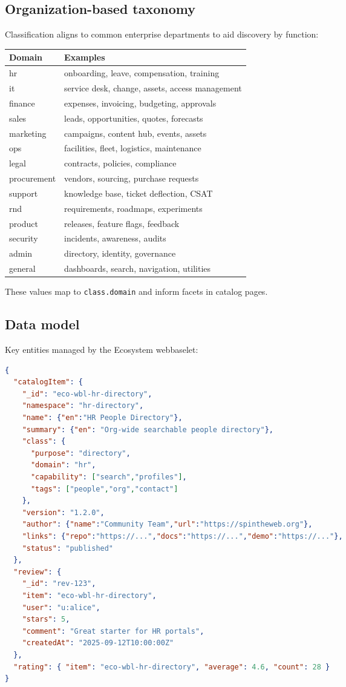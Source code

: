 \subsection{Organization-based taxonomy}
Classification aligns to common enterprise departments to aid discovery by function:
\begin{tabularx}{\linewidth}{@{}l X@{}}
  \textbf{Domain} & \textbf{Examples} \\
\hline
hr & onboarding, leave, compensation, training \\
it & service desk, change, assets, access management \\
finance & expenses, invoicing, budgeting, approvals \\
sales & leads, opportunities, quotes, forecasts \\
marketing & campaigns, content hub, events, assets \\
ops & facilities, fleet, logistics, maintenance \\
legal & contracts, policies, compliance \\
procurement & vendors, sourcing, purchase requests \\
support & knowledge base, ticket deflection, CSAT \\
rnd & requirements, roadmaps, experiments \\
product & releases, feature flags, feedback \\
security & incidents, awareness, audits \\
admin & directory, identity, governance \\
general & dashboards, search, navigation, utilities \\
\end{tabularx}

These values map to \texttt{class.domain} and inform facets in catalog pages.

\subsection{Data model}
Key entities managed by the Ecosystem webbaselet:
\begin{lstlisting}[language=JSON,caption={Ecosystem entities}]
{
  "catalogItem": {
    "_id": "eco-wbl-hr-directory",
    "namespace": "hr-directory",
    "name": {"en":"HR People Directory"},
    "summary": {"en": "Org-wide searchable people directory"},
    "class": {
      "purpose": "directory",
      "domain": "hr",
      "capability": ["search","profiles"],
      "tags": ["people","org","contact"]
    },
    "version": "1.2.0",
    "author": {"name":"Community Team","url":"https://spintheweb.org"},
    "links": {"repo":"https://...","docs":"https://...","demo":"https://..."},
    "status": "published"
  },
  "review": {
    "_id": "rev-123",
    "item": "eco-wbl-hr-directory",
    "user": "u:alice",
    "stars": 5,
    "comment": "Great starter for HR portals",
    "createdAt": "2025-09-12T10:00:00Z"
  },
  "rating": { "item": "eco-wbl-hr-directory", "average": 4.6, "count": 28 }
}
\end{lstlisting}

